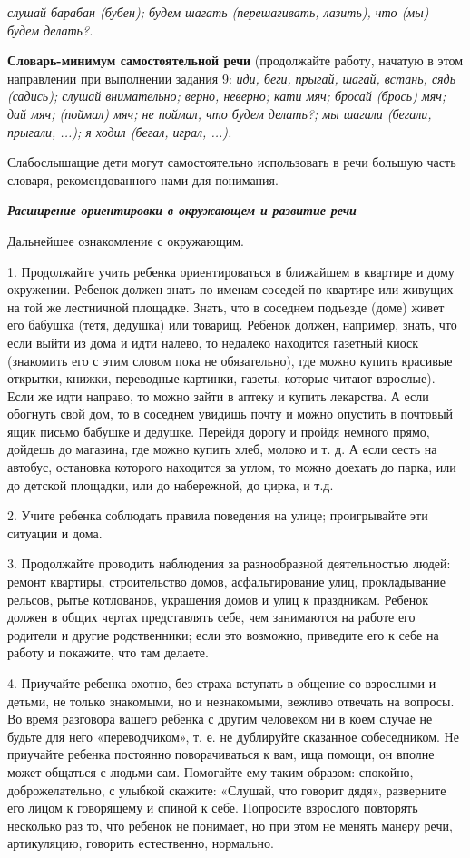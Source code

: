 \documentclass[a5paper]{book}
\renewcommand{\emph}[1]{\textit{#1}}
\begin{document}
\emph{слушай барабан (бубен); будем шагать (перешагивать, лазить), что
(мы) будем делать?.}

\textbf{Словарь-минимум самостоятельной речи} (продолжайте работу,
начатую в этом направлении при выполнении задания 9: \emph{иди, беги,}
\emph{прыгай,} \emph{шагай, встань, сядь (садись); слушай внимательно;
верно, неверно; кати мяч; бросай (брось) мяч; дай мяч; (поймал) мяч; не
поймал, что будем делать?; мы шагали (бегали, прыгали, ...); я ходил
(бегал, играл, ...).}

Слабослышащие дети могут самостоятельно использовать в речи большую
часть словаря, рекомендованного нами для понимания.

\emph{\textbf{Расширение ориентировки в окружающем и развитие речи}}

Дальнейшее ознакомление с окружающим.

1. Продолжайте учить ребенка ориентироваться в ближайшем в квартире и
дому окружении. Ребенок должен знать по именам соседей по квартире или
живущих на той же лестничной площадке. Знать, что в соседнем подъезде
(доме) живет его бабушка (тетя, дедушка) или товарищ. Ребенок должен,
например, знать, что если выйти из дома и идти налево, то недалеко
находится газетный киоск (знакомить его с этим словом пока не
обязательно), где можно купить красивые открытки, книжки, переводные
картинки, газеты, которые читают взрослые). Если же идти направо, то
можно зайти в аптеку и купить лекарства. А если обогнуть свой дом, то в
соседнем увидишь почту и можно опустить в почтовый ящик письмо бабушке и
дедушке. Перейдя дорогу и пройдя немного прямо, дойдешь до магазина, где
можно купить хлеб, молоко и т. д. А если сесть на автобус, остановка
которого находится за углом, то можно доехать до парка, или до детской
площадки, или до набережной, до цирка, и т.д.

2. Учите ребенка соблюдать правила поведения на улице; проигрывайте эти
ситуации и дома.

3. Продолжайте проводить наблюдения за разнообразной деятельностью
людей: ремонт квартиры, строительство домов, асфальтирование улиц,
прокладывание рельсов, рытье котлованов, украшения домов и улиц к
праздникам. Ребенок должен в общих чертах представлять себе, чем
занимаются на работе его родители и другие родственники; если это
возможно, приведите его к себе на работу и покажите, что там делаете.

4. Приучайте ребенка охотно, без страха вступать в общение со взрослыми
и детьми, не только знакомыми, но и незнакомыми, вежливо отвечать на
вопросы. Во время разговора вашего ребенка с другим человеком ни в коем
случае не будьте для него «переводчиком», т. е. не дублируйте сказанное
собеседником. Не приучайте ребенка постоянно поворачиваться к вам, ища
помощи, он вполне может общаться с людьми сам. Помогайте ему таким
образом: спокойно, доброжелательно, с улыбкой скажите: «Слушай, что
говорит дядя», разверните его лицом к говорящему и спиной к себе.
Попросите взрослого повторять несколько раз то, что ребенок не понимает,
но при этом не менять манеру речи, артикуляцию, говорить естественно,
нормально.
\end{document}

